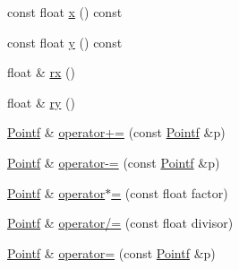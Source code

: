 \begin{DoxyCompactItemize}
\item 
const float \hyperlink{classprism_1_1geometry_1_1_pointf_a2b05b92db0060a90deb6478838abe718}{x} () const 
\item 
const float \hyperlink{classprism_1_1geometry_1_1_pointf_aad05c69bc2f5496489e1095d84b1508c}{y} () const 
\item 
float \& \hyperlink{classprism_1_1geometry_1_1_pointf_a172225ca36d04da7d09dd832dfb95a84}{rx} ()
\item 
float \& \hyperlink{classprism_1_1geometry_1_1_pointf_a843fe0a023079e3171e3b54521c2af65}{ry} ()
\item 
\hyperlink{classprism_1_1geometry_1_1_pointf}{Pointf} \& \hyperlink{classprism_1_1geometry_1_1_pointf_a383950f85349cc0b341ecc2ac7d20836}{operator+=} (const \hyperlink{classprism_1_1geometry_1_1_pointf}{Pointf} \&p)
\item 
\hyperlink{classprism_1_1geometry_1_1_pointf}{Pointf} \& \hyperlink{classprism_1_1geometry_1_1_pointf_a41a40be9ef200898d338f22545d9771e}{operator-\/=} (const \hyperlink{classprism_1_1geometry_1_1_pointf}{Pointf} \&p)
\item 
\hyperlink{classprism_1_1geometry_1_1_pointf}{Pointf} \& \hyperlink{classprism_1_1geometry_1_1_pointf_a1cc6ef6ea1d5fb977cbaf0127da1c5d0}{operator$\ast$=} (const float factor)
\item 
\hyperlink{classprism_1_1geometry_1_1_pointf}{Pointf} \& \hyperlink{classprism_1_1geometry_1_1_pointf_af0c4ea9b00e5a045b45ee7d2f1e8b7e2}{operator/=} (const float divisor)
\item 
\hyperlink{classprism_1_1geometry_1_1_pointf}{Pointf} \& \hyperlink{classprism_1_1geometry_1_1_pointf_aa8430c8ab9321a0df15eba0f33b11d82}{operator=} (const \hyperlink{classprism_1_1geometry_1_1_pointf}{Pointf} \&p)
\end{DoxyCompactItemize}
